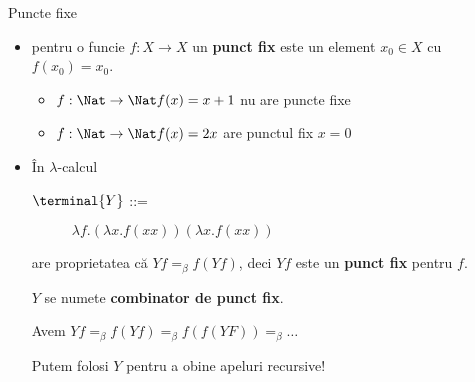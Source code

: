 \documentclass[xcolor=pdftex,romanian,colorlinks]{beamer}
\begin{document}
\begin{frame}[fragile]{Puncte fixe}

\begin{itemize}
\item pentru o func\ts ie $f:X\to X$ un {\bf punct fix} este un element $x_0\in X$ cu $f(x_0)=x_0$.


\begin{itemize}
\item $f:\Nat\to\Nat f(x)=x+1$ nu are puncte fixe
\item $f:\Nat\to\Nat f(x)=2x$ are punctul fix $x=0$
\end{itemize} 

\pause

\item \^{I}n $\lambda$-calcul  
  \begin{description}
    \item[$\terminal{Y}$ ::= ] $\lambda f. (\lambda x. f(xx))(\lambda x. f(xx))$
\end{description}
    
are proprietatea c\u a $Yf =_\beta f(Yf)$, deci $Yf$ este un {\bf punct fix} pentru $f$.     
    \pause

\medskip

$Y$ se nume\sh te {\bf combinator de punct fix}. \pause\medskip


Avem $Yf =_\beta f(Yf) =_\beta f(f(YF)) =_\beta \ldots$

\medskip
Putem folosi $Y$ pentru a ob\ts ine apeluri recursive!
\end{itemize}
\end{frame}
\end{document}
